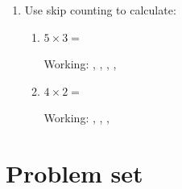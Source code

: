 \documentclass{tufte-book}
\begin{document}
\begin{enumerate}
  \item Use skip counting to calculate:
  \begin{enumerate}\bigskip
    \item $5 \times 3 = $\dotfill\bigskip\par
      Working: \dotfill, \dotfill, \dotfill, \dotfill, \dotfill\bigskip
    \item $4 \times 2 = $\dotfill\bigskip\par
      Working: \dotfill, \dotfill, \dotfill, \dotfill\bigskip
  \end{enumerate}
\end{enumerate}


\clearpage\section{Problem set }
\end{document}
